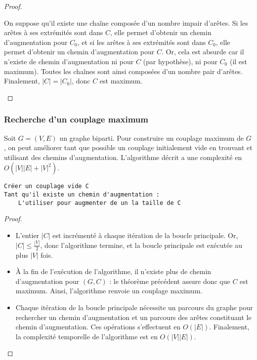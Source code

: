 \documentclass[11pt,a4paper]{article}
\begin{document}
\begin{proof}
\begin{itemize}
      On suppose qu'il existe une chaîne composée d'un nombre impair d'arêtes. Si les arêtes à ses extrémités sont dans \(C\), elle permet d'obtenir un chemin d'augmentation pour \(C_0\), et si les arêtes à ses extrémités sont dans \(C_0\), elle permet d'obtenir un chemin d'augmentation pour \(C\). Or, cela est absurde car il n'existe de chemin d'augmentation ni pour \(C\) (par hypothèse), ni pour \(C_0\) (il est maximum). Toutes les chaînes sont ainsi composées d'un nombre pair d'arêtes. Finalement, \(|C|=|C_0|\), donc \(C\) est maximum.

  \end{itemize}
\end{proof}


      \subsubsection{Recherche d'un couplage maximum}
Soit \(G=(V,E)\) un graphe biparti. Pour construire un couplage maximum de \(G\), on peut améliorer tant que possible un couplage initialement vide en trouvant et utilisant des chemins d'augmentation. L'algorithme décrit a une complexité en \(O(|V||E| + |V|^2)\).

\begin{lstlisting}
Créer un couplage vide C
Tant qu'il existe un chemin d'augmentation :
    L'utiliser pour augmenter de un la taille de C
\end{lstlisting}

\begin{proof}\leavevmode
  \begin{itemize}
    \item L'entier \(|C|\) est incrémenté à chaque itération de la boucle principale. Or, \(|C| \leq \frac{|V|}{2}\), donc l'algorithme termine, et la boucle principale est exécutée au plus \(|V|\) fois.
    \item À la fin de l'exécution de l'algorithme, il n'existe plus de chemin d'augmentation pour \((G,C)\) : le théorème précédent assure donc que \(C\) est maximum. Ainsi, l'algorithme renvoie un couplage maximum.
    \item Chaque itération de la boucle principale nécessite un parcours du graphe pour rechercher un chemin d'augmentation et un parcours des arêtes constituant le chemin d'augmentation. Ces opérations s'effectuent en \(O(|E|)\). Finalement, la complexité temporelle de l'algorithme est en \(O(|V||E|)\).
  \end{itemize}
\end{proof}
\end{document}
